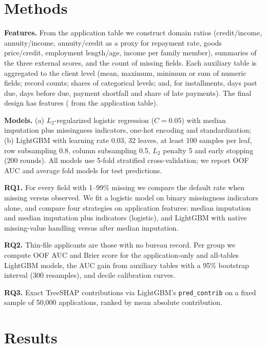 \documentclass[10pt]{article}
\begin{document}
\section{Methods}
\textbf{Features.} From the application table we construct domain ratios (credit/income, annuity/income, annuity/credit as a proxy for repayment rate, goods price/credit, employment length/age, income per family member), summaries of the three external scores, and the count of missing fields. Each auxiliary table is aggregated to the client level (mean, maximum, minimum or sum of numeric fields; record counts; shares of categorical levels; and, for installments, days past due, days before due, payment shortfall and share of late payments). The final design has \NFeatAll{} features (\NFeatApp{} from the application table).

\textbf{Models.} (a) $L_2$-regularized logistic regression ($C=0.05$) with median imputation plus missingness indicators, one-hot encoding and standardization; (b) LightGBM \citep{ke2017lightgbm} with learning rate 0.03, 32 leaves, at least 100 samples per leaf, row subsampling 0.8, column subsampling 0.5, $L_2$ penalty 5 and early stopping (200 rounds). All models use 5-fold stratified cross-validation; we report OOF AUC and average fold models for test predictions.

\textbf{RQ1.} For every field with 1--99\% missing we compare the default rate when missing versus observed. We fit a logistic model on binary missingness indicators alone, and compare four strategies on application features: median imputation and median imputation plus indicators (logistic), and LightGBM with native missing-value handling versus after median imputation.

\textbf{RQ2.} Thin-file applicants are those with no bureau record. Per group we compute OOF AUC and Brier score for the application-only and all-tables LightGBM models, the AUC gain from auxiliary tables with a 95\% bootstrap interval (300 resamples), and decile calibration curves.

\textbf{RQ3.} Exact TreeSHAP contributions \citep{lundberg2020local} via LightGBM's \texttt{pred\_contrib} on a fixed sample of 50,000 applications, ranked by mean absolute contribution.

\section{Results}
\begin{table}[h]\centering\small
\caption{Predictive performance (5-fold OOF AUC) and Kaggle late-submission scores.}\label{tab:main}

\end{table}
\end{document}
